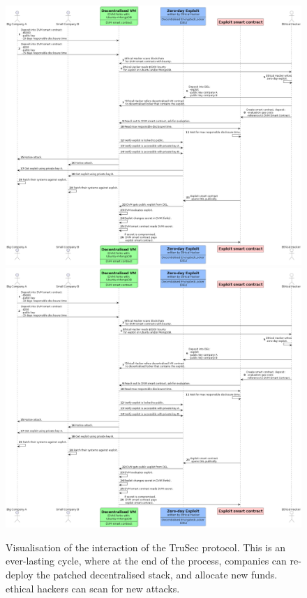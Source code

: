 \begin{figure}[H]
    \centering
    \ifx\homepath\overleafhome
        \includegraphics[width=1.0\textwidth]{Images/Diagrams/interaction.png}
    \else
        \includegraphics[width=1.0\textwidth]{latex/Images/Diagrams/interaction.png}
    \fi
    
    \caption{Visualisation of the interaction of the TruSec protocol. This is an ever-lasting cycle, where at the end of the process, companies can re-deploy the patched decentralised stack, and allocate new funds. ethical hackers can scan for new attacks.}
    \label{fig:interaction}
\end{figure}
\noindent 

